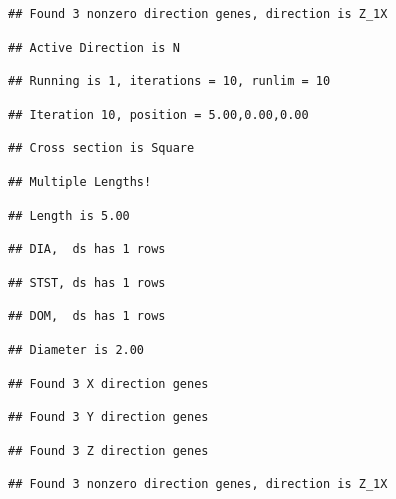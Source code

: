 \documentclass[]{article}
\begin{document}
\begin{verbatim}
## Found 3 nonzero direction genes, direction is Z_1X
\end{verbatim}

\begin{verbatim}
## Active Direction is N
\end{verbatim}

\begin{verbatim}
## Running is 1, iterations = 10, runlim = 10
\end{verbatim}

\begin{verbatim}
## Iteration 10, position = 5.00,0.00,0.00
\end{verbatim}

\begin{verbatim}
## Cross section is Square
\end{verbatim}

\begin{verbatim}
## Multiple Lengths!
\end{verbatim}

\begin{verbatim}
## Length is 5.00
\end{verbatim}

\begin{verbatim}
## DIA,  ds has 1 rows
\end{verbatim}

\begin{verbatim}
## STST, ds has 1 rows
\end{verbatim}

\begin{verbatim}
## DOM,  ds has 1 rows
\end{verbatim}

\begin{verbatim}
## Diameter is 2.00
\end{verbatim}

\begin{verbatim}
## Found 3 X direction genes
\end{verbatim}

\begin{verbatim}
## Found 3 Y direction genes
\end{verbatim}

\begin{verbatim}
## Found 3 Z direction genes
\end{verbatim}

\begin{verbatim}
## Found 3 nonzero direction genes, direction is Z_1X
\end{verbatim}
\end{document}
